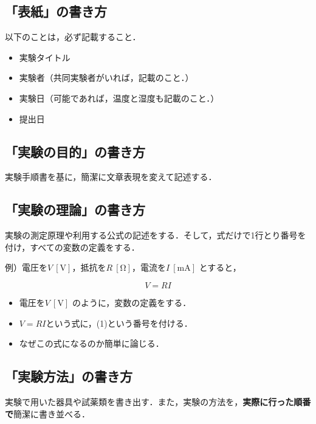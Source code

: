 \documentclass[a4paper,11pt]{ltjsarticle}
\begin{document}
\subsection{「表紙」の書き方}

以下のことは，必ず記載すること．

\begin{itemize}
    \item 実験タイトル
    \item 実験者（共同実験者がいれば，記載のこと．）
    \item 実験日（可能であれば，温度と湿度も記載のこと．）
    \item 提出日
\end{itemize}

\clearpage

\subsection{「実験の目的」の書き方}

実験手順書を基に，簡潔に文章表現を変えて記述する．

\subsection{「実験の理論」の書き方}

実験の測定原理や利用する公式の記述をする．そして，式だけで1行とり番号を付け，すべての変数の定義をする．

例）電圧を$V\ [\mathrm{V}]$，抵抗を$R\ [\mathrm{\Omega}]$，電流を$I\ [\mathrm{mA}]$ とすると，

\begin{equation}
    V = RI
\end{equation}

\begin{itemize}
    \item 電圧を$V\ [\mathrm{V}]$ のように，変数の定義をする．
    \item $V = RI$という式に，(1)という番号を付ける．
    \item なぜこの式になるのか簡単に論じる．
\end{itemize}

\subsection{「実験方法」の書き方}

実験で用いた器具や試薬類を書き出す．また，実験の方法を，\textbf{実際に行った順番で}簡潔に書き並べる．
\end{document}
